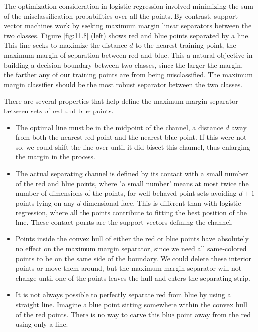 \documentclass[10pt]{article}
\begin{document}
\begin{enumerate}
The optimization consideration in logistic regression involved minimizing the sum of the misclassification probabilities over all the points. By contrast, support vector machines work by seeking maximum margin linear separators between the two classes. Figure \ref{fig:11.8} (left) shows red and blue points separated by a line. This line seeks to maximize the distance $d$ to the nearest training point, the maximum margin of separation between red and blue. This a natural objective in building a decision boundary between two classes, since the larger the margin, the farther any of our training points are from being misclassified. The maximum margin classifier should be the most robust separator between the two classes.

There are several properties that help define the maximum margin separator between sets of red and blue points:

\begin{itemize}
  \item The optimal line must be in the midpoint of the channel, a distance $d$ away from both the nearest red point and the nearest blue point. If this were not so, we could shift the line over until it did bisect this channel, thus enlarging the margin in the process.
  \item The actual separating channel is defined by its contact with a small number of the red and blue points, where "a small number" means at most twice the number of dimensions of the points, for well-behaved point sets avoiding $d+1$ points lying on any $d$-dimensional face. This is different than with logistic regression, where all the points contribute to fitting the best position of the line. These contact points are the support vectors defining the channel.
  \item Points inside the convex hull of either the red or blue points have absolutely no effect on the maximum margin separator, since we need all same-colored points to be on the same side of the boundary. We could delete these interior points or move them around, but the maximum margin separator will not change until one of the points leaves the hull and enters the separating strip.
  \item It is not always possible to perfectly separate red from blue by using a straight line. Imagine a blue point sitting somewhere within the convex hull of the red points. There is no way to carve this blue point away from the red using only a line.
\end{itemize}


\end{enumerate}
\end{document}
